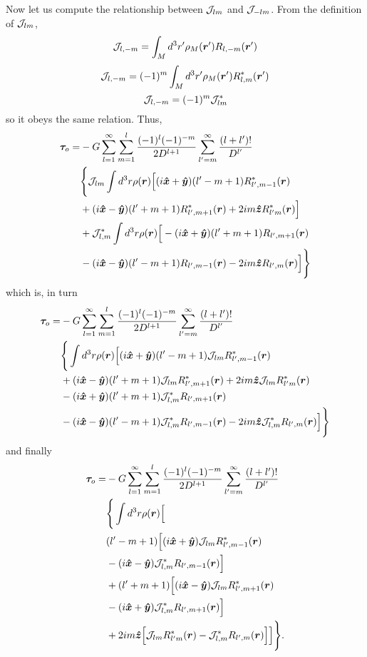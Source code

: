 \documentclass[aps,twocolumn,secnumarabic,balancelastpage,amsmath,amssymb,nofootinbib,floatfix]{revtex4-1}
\begin{document}
Now let us compute the relationship between $\mathcal{J}_{lm}$ and $\mathcal{J}_{-lm}$. From the definition of $\mathcal{J}_{lm}$,
$$\mathcal{J}_{l,-m} = \int_M d^3 r' \rho_M(\bm r')R_{l,-m}(\bm r')$$
$$\mathcal{J}_{l,-m} = (-1)^m\int_M d^3 r' \rho_M(\bm r')R^*_{l,m}(\bm r')$$
$$\mathcal{J}_{l,-m} = (-1)^m\mathcal{J}_{lm}^*$$
so it obeys the same relation. Thus,
\begin{equation*}
\begin{aligned}
\bm \tau_o = &-G\sum_{l=1}^\infty \sum_{m=1}^l \frac{(-1)^l(-1)^{-m}}{2D^{l+1}}\sum_{l'=m}^\infty \frac{(l+l')!}{D^{l'}}\\
&\Bigg\{\mathcal{J}_{lm} \int d^3 r\rho(\bm r)\Big[(i\bm{\hat x} + \bm{\hat y})(l'-m+1)R^*_{l',m-1}(\bm r)\\
&+(i\bm{\hat x}-\bm{\hat y})(l'+m+1)R^*_{l',m+1}(\bm r)+2im\bm{\hat z} R^*_{l'm}(\bm r)\Big] \\
&+ \mathcal{J}_{l,m}^* \int d^3 r\rho(\bm r)\Big[-(i\bm{\hat x} + \bm{\hat y})(l'+m+1)R_{l',m+1}(\bm r)\\
&-(i\bm{\hat x}-\bm{\hat y})(l'-m+1)R_{l',m-1}(\bm r)-2im\bm{\hat z} R_{l',m}(\bm r)\Big]\Bigg\}
\end{aligned}
\end{equation*}
which is, in turn
\begin{equation*}
\begin{aligned}
\bm \tau_o = &-G\sum_{l=1}^\infty \sum_{m=1}^l \frac{(-1)^l(-1)^{-m}}{2D^{l+1}}\sum_{l'=m}^\infty \frac{(l+l')!}{D^{l'}}\\
&\Bigg\{\int d^3 r\rho(\bm r)\Big[(i\bm{\hat x} + \bm{\hat y})(l'-m+1)\mathcal{J}_{lm} R^*_{l',m-1}(\bm r)\\
&+(i\bm{\hat x}-\bm{\hat y})(l'+m+1)\mathcal{J}_{lm} R^*_{l',m+1}(\bm r)+2im\bm{\hat z} \mathcal{J}_{lm} R^*_{l'm}(\bm r) \\
&-(i\bm{\hat x} + \bm{\hat y})(l'+m+1)\mathcal{J}_{l,m}^* R_{l',m+1}(\bm r)\\
&-(i\bm{\hat x}-\bm{\hat y})(l'-m+1)\mathcal{J}_{l,m}^* R_{l',m-1}(\bm r)-2im\bm{\hat z} \mathcal{J}_{l,m}^* R_{l',m}(\bm r)\Big]\Bigg\}
\end{aligned}
\end{equation*}
and finally
\begin{equation*}
\begin{aligned}
\bm \tau_o = &-G\sum_{l=1}^\infty \sum_{m=1}^l \frac{(-1)^l(-1)^{-m}}{2D^{l+1}}\sum_{l'=m}^\infty \frac{(l+l')!}{D^{l'}}\\
&\Bigg\{\int d^3 r\rho(\bm r)\Big[\\
&(l'-m+1)\Big[(i\bm{\hat x} + \bm{\hat y})\mathcal{J}_{lm} R^*_{l',m-1}(\bm r)\\
&-(i\bm{\hat x}-\bm{\hat y})\mathcal{J}_{l,m}^* R_{l',m-1}(\bm r)\Big]\\
&+(l'+m+1)\Big[(i\bm{\hat x}-\bm{\hat y})\mathcal{J}_{lm} R^*_{l',m+1}(\bm r)\\
&- (i\bm{\hat x} + \bm{\hat y})\mathcal{J}_{l,m}^* R_{l',m+1}(\bm r)\Big]\\
&+2im\bm{\hat z}\Big[\mathcal{J}_{lm} R^*_{l'm}(\bm r)-\mathcal{J}_{l,m}^* R_{l',m}(\bm r)\Big]\Big]\Bigg\}.
\end{aligned}
\end{equation*}
\end{document}
